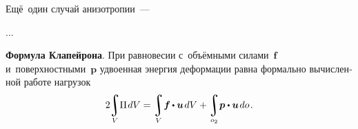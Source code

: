 \begin{otherlanguage}{russian}
Ещё~один случай анизотропии~---

...





\noindent\leavevmode{\indent}%
\textbf{Формула Клапейрона}. При равновесии с~объёмными силами~$\bm{f}$ и~поверхностными~$\bm{p}$ удвоенная энергия деформации равна формально вычисленной работе нагрузок
\vspace{0.1em}\begin{equation}\label{clapeyron:elasticitytheorem}
2 \hspace{-0.2em}
\integral\displaylimits_V \hspace{-0.5ex} \Pi \hspace{0.2ex} dV =
\integral\displaylimits_V \hspace{-0.4ex} \bm{f} \hspace{-0.1ex} \dotp \bm{u} \hspace{0.25ex} dV +
\integral\displaylimits_{o_2} \hspace{-0.4ex} \bm{p} \dotp \bm{u} \hspace{0.25ex} do \hspace{0.2ex} .
\end{equation}


\end{otherlanguage}
